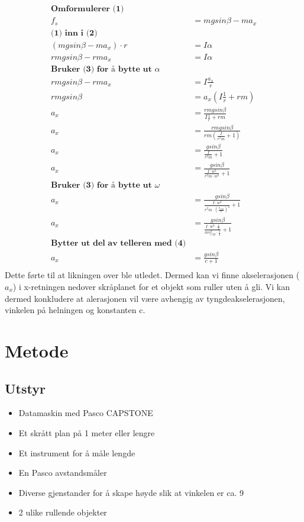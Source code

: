\documentclass[12pt]{article}
\begin{document}
\begin{align*}
    \textbf{Omformulerer (1)} \\
    f_s &= m g sin \beta - m a_x \\
    \textbf{(1) inn i (2)} \\
    (m g sin \beta - ma_x) \cdot r &= I \alpha \\
    r m g sin \beta  - r m a_x &= I \alpha \\
    \textbf{Bruker (3) for å bytte ut $\alpha$} \\
    r m g sin \beta  - r m a_x &= I \frac{a_x}{r} \\
    r m g sin \beta &= a_x (I \frac{1}{r} + r m) \\
    a_x &= \frac{r m g sin \beta}{I \frac{1}{r} + r m} \\
    a_x &= \frac{r m g sin \beta}{r m ( \frac{I}{r^2 m} + 1)} \\
    a_x &= \frac{g sin \beta}{ \frac{I}{r^2 m} + 1} \\
    a_x &= \frac{g sin \beta}{ \frac{I \cdot w^2}{r^2 m \cdot w^2} + 1} \\
    \textbf{Bruker (3) for å bytte ut $\omega$} \\
    a_x &= \frac{g sin \beta}{ \frac{I \cdot w^2}{r^2 m \cdot (\frac{v_{CM}}{r})^2} + 1} \\
    a_x &= \frac{g sin \beta}{ \frac{I \cdot w^2 \cdot \frac{1}{2}}{m v_{CM}^2 \cdot \frac{1}{2}} + 1} \\
    \textbf{Bytter ut del av telleren med (4)} \\
    a_x &= \frac{g sin \beta}{ c + 1} \\
\end{align*}
Dette førte til at likningen over ble utledet. Dermed kan vi finne akselerasjonen (\(a_x\)) i x-retningen nedover skråplanet for et objekt som ruller uten å gli. Vi kan dermed konkludere at alerasjonen vil være avhengig av tyngdeakselerasjonen, vinkelen på helningen og konstanten c.

\newpage
\section{Metode}

\subsection{Utstyr}
\begin{itemize}
    \item Datamaskin med Pasco CAPSTONE
    \item Et skrått plan på 1 meter eller lengre
    \item Et instrument for å måle lengde
    \item En Pasco avstandsmåler
    \item Diverse gjenstander for å skape høyde slik at vinkelen er ca. 9\degree
    \item 2 ulike rullende objekter
\end{itemize}
\end{document}
